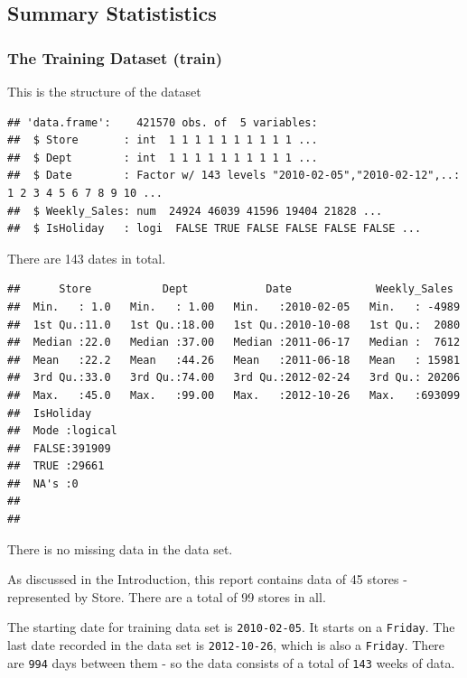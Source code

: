 \documentclass[]{article}
\begin{document}
\subsection{Summary Statististics}\label{summary-statististics}

\subsubsection{The Training Dataset
(train)}\label{the-training-dataset-train}

This is the structure of the dataset

\begin{verbatim}
## 'data.frame':    421570 obs. of  5 variables:
##  $ Store       : int  1 1 1 1 1 1 1 1 1 1 ...
##  $ Dept        : int  1 1 1 1 1 1 1 1 1 1 ...
##  $ Date        : Factor w/ 143 levels "2010-02-05","2010-02-12",..: 1 2 3 4 5 6 7 8 9 10 ...
##  $ Weekly_Sales: num  24924 46039 41596 19404 21828 ...
##  $ IsHoliday   : logi  FALSE TRUE FALSE FALSE FALSE FALSE ...
\end{verbatim}

There are 143 dates in total.

\begin{verbatim}
##      Store           Dept            Date             Weekly_Sales   
##  Min.   : 1.0   Min.   : 1.00   Min.   :2010-02-05   Min.   : -4989  
##  1st Qu.:11.0   1st Qu.:18.00   1st Qu.:2010-10-08   1st Qu.:  2080  
##  Median :22.0   Median :37.00   Median :2011-06-17   Median :  7612  
##  Mean   :22.2   Mean   :44.26   Mean   :2011-06-18   Mean   : 15981  
##  3rd Qu.:33.0   3rd Qu.:74.00   3rd Qu.:2012-02-24   3rd Qu.: 20206  
##  Max.   :45.0   Max.   :99.00   Max.   :2012-10-26   Max.   :693099  
##  IsHoliday      
##  Mode :logical  
##  FALSE:391909   
##  TRUE :29661    
##  NA's :0        
##                 
## 
\end{verbatim}

 There is no missing data in the data set.

As discussed in the Introduction, this report contains data of 45 stores
- represented by Store. There are a total of 99 stores in all.

The starting date for training data set is \texttt{2010-02-05}. It
starts on a \texttt{Friday}. The last date recorded in the data set is
\texttt{2012-10-26}, which is also a \texttt{Friday}. There are
\texttt{994} days between them - so the data consists of a total of
\texttt{143} weeks of data.
\end{document}
